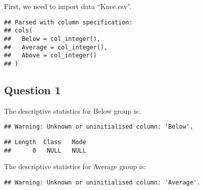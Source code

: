 \documentclass[]{article}
\newenvironment{Shaded}{\begin{snugshade}}{\end{snugshade}}
\newcommand{\KeywordTok}[1]{\textcolor[rgb]{0.13,0.29,0.53}{\textbf{#1}}}
\newcommand{\DataTypeTok}[1]{\textcolor[rgb]{0.13,0.29,0.53}{#1}}
\newcommand{\StringTok}[1]{\textcolor[rgb]{0.31,0.60,0.02}{#1}}
\newcommand{\OperatorTok}[1]{\textcolor[rgb]{0.81,0.36,0.00}{\textbf{#1}}}
\newcommand{\NormalTok}[1]{#1}
\begin{document}
First, we need to import data ``Knee.csv''.

\begin{Shaded}
\end{Shaded}

\begin{verbatim}
## Parsed with column specification:
## cols(
##   Below = col_integer(),
##   Average = col_integer(),
##   Above = col_integer()
## )
\end{verbatim}

\subsection{Question 1}\label{question-1-2}

The descriptive statistics for Below group is:

\begin{Shaded}
\end{Shaded}

\begin{verbatim}
## Warning: Unknown or uninitialised column: 'Below'.
\end{verbatim}

\begin{verbatim}
## Length  Class   Mode 
##      0   NULL   NULL
\end{verbatim}

The descriptive statistics for Average group is:

\begin{Shaded}
\end{Shaded}

\begin{verbatim}
## Warning: Unknown or uninitialised column: 'Average'.
\end{verbatim}
\end{document}
